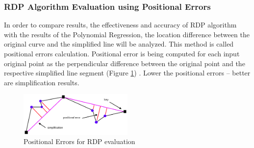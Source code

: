 \subsubsection{RDP Algorithm Evaluation using Positional Errors}

In order to compare results, the effectiveness and accuracy of RDP algorithm with the results of the Polynomial Regression, the location difference between the original curve and the simplified line will be analyzed. This method is called positional errors calculation. Positional error is being computed for each input original point as the perpendicular difference between the original point and the respective simplified line segment (Figure \ref{fig:rdp_algo_eval}) \cite{online:rdp_algo_var}. Lower the positional errors -- better are simplification results.

\begin{figure}[!htb]
	\centering{}
	\includegraphics[width=0.5\textwidth]{images/rdp-algo-eval.png}
	\caption{Positional Errors for RDP evaluation \cite{online:rdp_algo_var}}
	\label{fig:rdp_algo_eval}
\end{figure}
